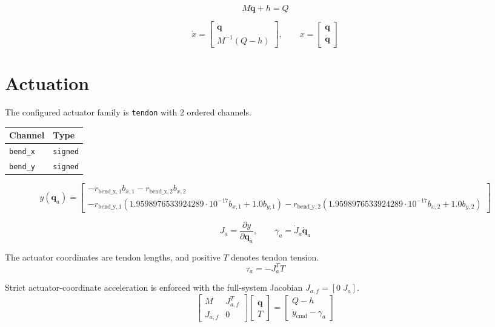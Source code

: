 \documentclass[11pt]{article}
\begin{document}
\begin{equation}
M\ddot{\boldsymbol q}+h=Q\label{eq:dynamics}
\end{equation}

\begin{equation}
\dot x=\begin{bmatrix}\dot{\boldsymbol q}\\M^{-1}(Q-h)\end{bmatrix},\qquad x=\begin{bmatrix}\boldsymbol q\\\dot{\boldsymbol q}\end{bmatrix}
\end{equation}


\section{Actuation}
The configured actuator family is \texttt{tendon} with 2 ordered channels.
\begin{center}
\begin{tabular}{ll}
\hline
Channel & Type \\
\hline
\texttt{bend\_x} & \texttt{signed} \\
\texttt{bend\_y} & \texttt{signed} \\
\hline
\end{tabular}
\end{center}
\begin{equation}
y(\boldsymbol q_a)=\begin{bmatrix}- r_{\mathrm{bend\_x},1} b_{x,1} - r_{\mathrm{bend\_x},2} b_{x,2}\\- r_{\mathrm{bend\_y},1} \left(1.9598976533924289 \cdot 10^{-17} b_{x,1} + 1.0 b_{y,1}\right) - r_{\mathrm{bend\_y},2} \left(1.9598976533924289 \cdot 10^{-17} b_{x,2} + 1.0 b_{y,2}\right)\end{bmatrix}
\end{equation}

\begin{equation}
J_a=\frac{\partial y}{\partial\boldsymbol q_a},\qquad \gamma_a=\dot J_a\dot{\boldsymbol q}_a
\end{equation}

The actuator coordinates are tendon lengths, and positive $T$ denotes tendon tension.
\begin{equation}
\tau_a=-J_a^TT
\end{equation}

Strict actuator-coordinate acceleration is enforced with the full-system Jacobian $J_{a,f}=[0\;J_a]$.
\begin{equation}
\begin{bmatrix}M&J_{a,f}^{T}\\J_{a,f}&0\end{bmatrix}\begin{bmatrix}\ddot{\boldsymbol q}\\T\end{bmatrix}=\begin{bmatrix}Q-h\\\ddot y_{\mathrm{cmd}}-\gamma_a\end{bmatrix}
\end{equation}
\end{document}
